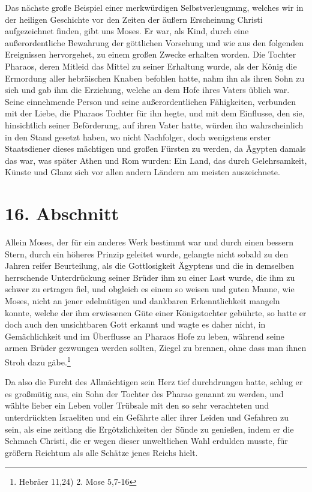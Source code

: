 Das nächste große Beispiel einer merkwürdigen
Selbstverleugnung, welches wir in
der heiligen Geschichte vor den Zeiten der äußern Erscheinung Christi
aufgezeichnet finden, gibt uns Moses. Er war, als Kind,
durch eine
außerordentliche Bewahrung der göttlichen Vorsehung und wie aus den folgenden
Ereignissen hervorgehet, zu einem großen Zwecke erhalten worden. Die Tochter
Pharaos,  deren Mitleid das Mittel zu seiner Erhaltung wurde, als der König die
Ermordung aller hebräischen Knaben befohlen hatte, nahm ihn als ihren Sohn zu
sich und gab ihm die Erziehung, welche an dem Hofe ihres Vaters üblich war.
Seine einnehmende Person und seine außerordentlichen Fähigkeiten, verbunden mit
der Liebe, die Pharaos Tochter für ihn hegte, und mit dem Einflusse, den sie,
hinsichtlich seiner Beförderung, auf ihren Vater hatte, würden ihn
wahrscheinlich in den Stand gesetzt haben, wo nicht Nachfolger, doch wenigstens
erster Staatsdiener dieses mächtigen und großen Fürsten zu werden, da
Ägypten  damals das war, was später Athen
 und Rom  wurden: Ein Land, das
durch Gelehrsamkeit, Künste und Glanz sich vor allen andern Ländern am meisten
auszeichnete.

\section{16. Abschnitt} \label{kap4_ab16}

Allein Moses, der für ein anderes Werk bestimmt war und durch einen bessern
Stern, durch ein höheres Prinzip geleitet wurde, gelangte nicht sobald zu den
Jahren reifer Beurteilung, als die Gottlosigkeit Ägyptens und die in demselben
herrschende Unterdrückung seiner Brüder ihm zu einer Last wurde, die ihm zu
schwer zu ertragen fiel, und obgleich es einem so weisen und guten Manne, wie
Moses, nicht an jener edelmütigen und dankbaren Erkenntlichkeit mangeln
konnte, welche der ihm erwiesenen Güte einer Königstochter gebührte, so hatte er
doch auch den unsichtbaren Gott erkannt und wagte es daher nicht, in
Gemächlichkeit und im Überflusse an Pharaos Hofe zu leben, während seine armen
Brüder gezwungen werden sollten, Ziegel zu brennen, ohne dass man ihnen Stroh
dazu gäbe.\footnote{Hebräer 11,24) 2. Mose 5,7-16}

\medskip

Da also die Furcht des Allmächtigen sein Herz tief durchdrungen hatte, schlug er
es großmütig aus, ein Sohn der Tochter des Pharao genannt zu werden, und wählte
lieber ein Leben voller Trübsale mit den so sehr verachteten und unterdrückten
Israeliten und ein Gefährte aller ihrer Leiden und Gefahren zu sein, als eine
zeitlang die Ergötzlichkeiten der Sünde zu genießen, indem er die Schmach
Christi, die er wegen dieser unweltlichen Wahl erdulden musste, für größern
Reichtum als alle Schätze jenes Reichs hielt.

